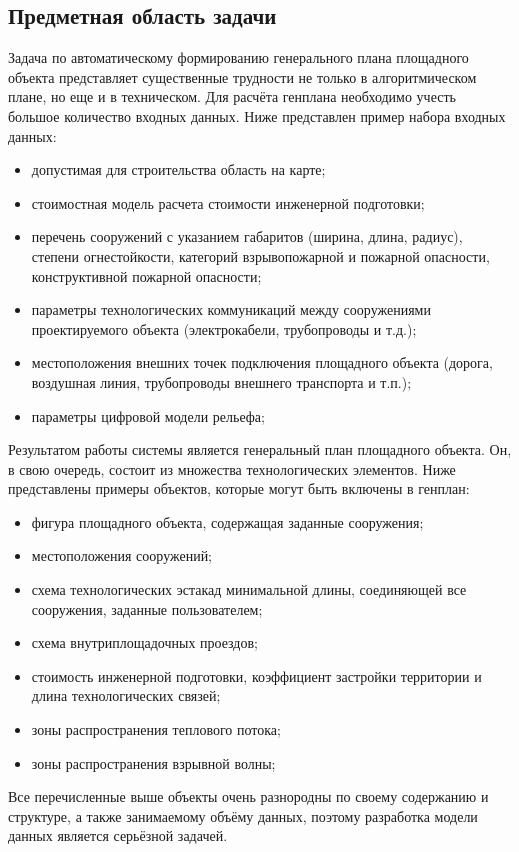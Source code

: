 \subsection{\Large{Предметная область задачи}}

Задача по автоматическому формированию генерального плана площадного объекта
представляет существенные трудности не только в алгоритмическом плане, но еще и в техническом.
Для расчёта генплана необходимо учесть большое количество входных данных.
Ниже представлен пример набора входных данных:
\begin{itemize}
    \item допустимая для строительства область на карте;
    \item стоимостная модель расчета стоимости инженерной подготовки;
    \item перечень сооружений с указанием габаритов (ширина, длина, радиус),
    степени огнестойкости, категорий взрывопожарной и пожарной опасности, конструктивной пожарной опасности;
    \item параметры технологических коммуникаций между сооружениями проектируемого объекта (электрокабели, трубопроводы и т.д.);
    \item местоположения внешних точек подключения площадного объекта
    (дорога, воздушная линия, трубопроводы внешнего транспорта и т.п.);
    \item параметры цифровой модели рельефа;
\end{itemize}

Результатом работы системы является генеральный план площадного объекта.
Он, в свою очередь, состоит из множества технологических элементов.
Ниже представлены примеры объектов, которые могут быть включены в генплан:
\begin{itemize}
    \item фигура площадного объекта, содержащая заданные сооружения;
    \item местоположения сооружений;
    \item схема технологических эстакад минимальной длины, соединяющей все сооружения, заданные пользователем;
    \item схема внутриплощадочных проездов;
    \item стоимость инженерной подготовки, коэффициент застройки территории и длина технологических связей;
    \item зоны распространения теплового потока;
    \item зоны распространения взрывной волны;
\end{itemize}

Все перечисленные выше объекты очень разнородны по своему содержанию и структуре, а также занимаемому объёму данных,
поэтому разработка модели данных является серьёзной задачей.